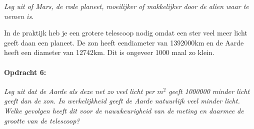 \emph{Leg uit of Mars, de rode planeet, moeilijker of makkelijker
door de alien waar te nemen is.}

In de praktijk heb je een grotere telescoop nodig omdat een ster veel
meer licht geeft daan een planeet. De zon heeft eendiameter van 1392000km
en de Aarde heeft een diameter van 12742km. Dit is ongeveer 1000 maal
zo klein.


\paragraph*{Opdracht 6:}

\emph{Leg uit dat de Aarde als deze net zo veel licht per $m^{2}$
geeft 1000000 minder licht geeft dan de zon. In werkelijkheid geeft
de Aarde natuurlijk veel minder licht. Welke gevolgen heeft dit voor
de nauwkeurigheid van de meting en daarmee de grootte van de telescoop?}


